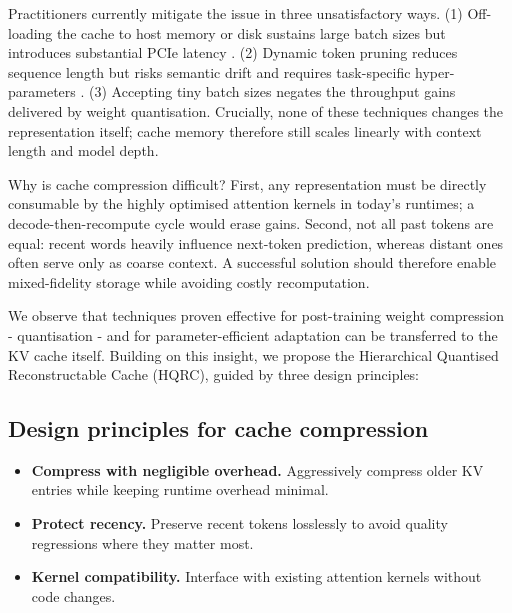 \documentclass{article}
\begin{document}
Practitioners currently mitigate the issue in three unsatisfactory ways. (1) Off-loading the cache to host memory or disk sustains large batch sizes but introduces substantial PCIe latency \cite{sheng-2023-flexgen}. (2) Dynamic token pruning reduces sequence length but risks semantic drift and requires task-specific hyper-parameters \cite{anagnostidis-2023-dynamic}. (3) Accepting tiny batch sizes negates the throughput gains delivered by weight quantisation. Crucially, none of these techniques changes the representation itself; cache memory therefore still scales linearly with context length and model depth.

Why is cache compression difficult? First, any representation must be directly consumable by the highly optimised attention kernels in today’s runtimes; a decode-then-recompute cycle would erase gains. Second, not all past tokens are equal: recent words heavily influence next-token prediction, whereas distant ones often serve only as coarse context. A successful solution should therefore enable mixed-fidelity storage while avoiding costly recomputation.

We observe that techniques proven effective for post-training weight compression - quantisation \cite{dettmers-2022-bit,kim-2023-squeezellm,egiazarian-2024-extreme} - and for parameter-efficient adaptation \cite{lialin-2023-relora,sehanobish-2024-structured} can be transferred to the KV cache itself. Building on this insight, we propose the Hierarchical Quantised Reconstructable Cache (HQRC), guided by three design principles:
\subsection{Design principles for cache compression}
\begin{itemize}
  \item \textbf{Compress with negligible overhead.} Aggressively compress older KV entries while keeping runtime overhead minimal.
  \item \textbf{Protect recency.} Preserve recent tokens losslessly to avoid quality regressions where they matter most.
  \item \textbf{Kernel compatibility.} Interface with existing attention kernels without code changes.
\end{itemize}
\end{document}

